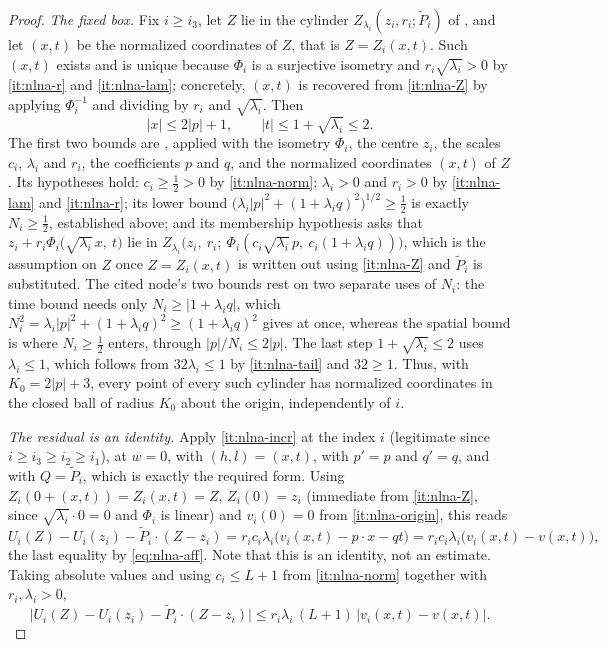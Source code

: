\begin{proof}
\emph{The fixed box.} Fix $i\ge i_3$, let $Z$ lie in the cylinder
$Z_{\lambda_i}(z_i,r_i;\widetilde P_i)$ of , and let
$(x,t)$ be the normalized coordinates of $Z$, that is $Z=Z_i(x,t)$. Such $(x,t)$
exists and is unique because $\Phi_i$ is a surjective isometry and
$r_i\sqrt{\lambda_i}>0$ by \ref{it:nlna-r} and \ref{it:nlna-lam}; concretely,
$(x,t)$ is recovered from \ref{it:nlna-Z} by applying $\Phi_i^{-1}$ and dividing
by $r_i$ and $\sqrt{\lambda_i}$. Then
\begin{equation}\label{eq:nlna-box}
  |x|\le2|p|+1,\qquad |t|\le1+\sqrt{\lambda_i}\le2 .
\end{equation}
The first two bounds are , applied with the
isometry $\Phi_i$, the centre $z_i$, the scales $c_i$, $\lambda_i$ and $r_i$, the
coefficients $p$ and $q$, and the normalized coordinates $(x,t)$ of $Z$. Its
hypotheses hold: $c_i\ge\tfrac12>0$ by \ref{it:nlna-norm}; $\lambda_i>0$ and
$r_i>0$ by \ref{it:nlna-lam} and \ref{it:nlna-r}; its lower bound
$\bigl(\lambda_i|p|^2+(1+\lambda_iq)^2\bigr)^{1/2}\ge\tfrac12$ is exactly
$N_i\ge\tfrac12$, established above; and its membership hypothesis asks that
$z_i+r_i\Phi_i\bigl(\sqrt{\lambda_i}\,x,\ t\bigr)$ lie in
$Z_{\lambda_i}\bigl(z_i,\ r_i;\ \Phi_i(c_i\sqrt{\lambda_i}\,p,\
c_i(1+\lambda_iq))\bigr)$, which is the assumption on $Z$ once $Z=Z_i(x,t)$ is
written out using \ref{it:nlna-Z} and $\widetilde P_i$ is substituted. The cited
node's two bounds rest on two separate uses of $N_i$: the time bound needs only
$N_i\ge|1+\lambda_iq|$, which $N_i^2=\lambda_i|p|^2+(1+\lambda_iq)^2\ge
(1+\lambda_iq)^2$ gives at once, whereas the spatial bound is where
$N_i\ge\tfrac12$ enters, through $|p|/N_i\le2|p|$. The last step
$1+\sqrt{\lambda_i}\le2$ uses $\lambda_i\le1$, which follows from
$32\lambda_i\le1$ by \ref{it:nlna-tail} and $32\ge1$. Thus, with $K_0=2|p|+3$,
every point of every such cylinder has normalized coordinates in the closed ball
of radius $K_0$ about the origin, independently of $i$.

\emph{The residual is an identity.} Apply \ref{it:nlna-incr} at the index $i$
(legitimate since $i\ge i_3\ge i_2\ge i_1$), at $w=0$, with $(h,l)=(x,t)$, with
$p'=p$ and $q'=q$, and with $Q=\widetilde P_i$, which is exactly the required
form. Using $Z_i(0+(x,t))=Z_i(x,t)=Z$, $Z_i(0)=z_i$ (immediate from
\ref{it:nlna-Z}, since $\sqrt{\lambda_i}\cdot0=0$ and $\Phi_i$ is linear) and
$v_i(0)=0$ from \ref{it:nlna-origin}, this reads
\[
  U_i(Z)-U_i(z_i)-\widetilde P_i\cdot(Z-z_i)
   =r_ic_i\lambda_i\bigl(v_i(x,t)-p\cdot x-qt\bigr)
   =r_ic_i\lambda_i\bigl(v_i(x,t)-v(x,t)\bigr),
\]
the last equality by \eqref{eq:nlna-aff}. Note that this is an identity, not an
estimate. Taking absolute values and using $c_i\le L+1$ from
\ref{it:nlna-norm} together with $r_i,\lambda_i>0$,
\begin{equation}\label{eq:nlna-resid}
  \bigl|U_i(Z)-U_i(z_i)-\widetilde P_i\cdot(Z-z_i)\bigr|
   \le r_i\lambda_i\,(L+1)\,\bigl|v_i(x,t)-v(x,t)\bigr| .
\end{equation}


\end{proof}
